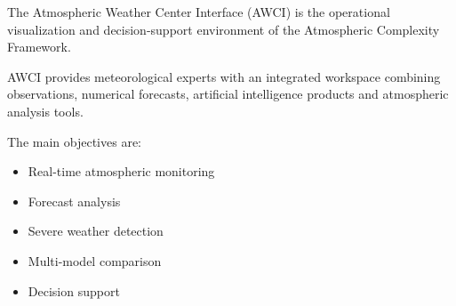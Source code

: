 The Atmospheric Weather Center Interface (AWCI) is the operational
visualization and decision-support environment of the Atmospheric
Complexity Framework.


AWCI provides meteorological experts with an integrated workspace
combining observations, numerical forecasts, artificial intelligence
products and atmospheric analysis tools.


The main objectives are:

\begin{itemize}

\item Real-time atmospheric monitoring

\item Forecast analysis

\item Severe weather detection

\item Multi-model comparison

\item Decision support

\end{itemize}
